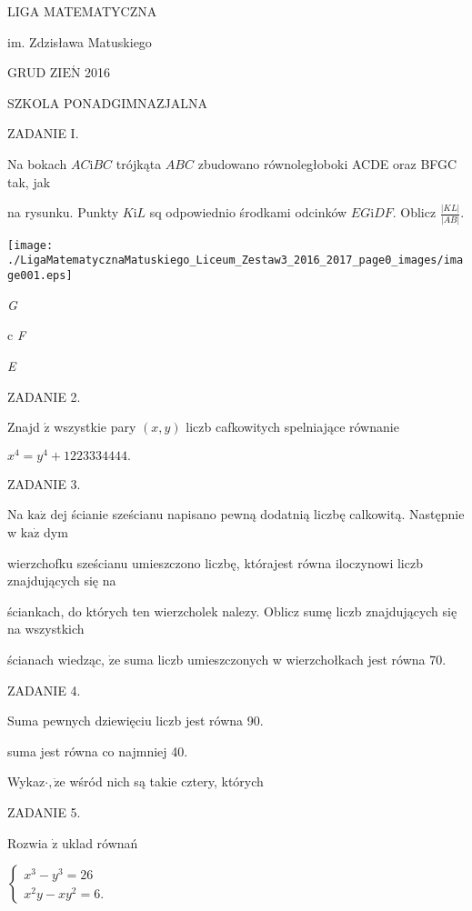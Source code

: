 \documentclass[a4paper,12pt]{article}
\begin{document}
LIGA MATEMATYCZNA

im. Zdzisława Matuskiego

GRUD Z$\mathrm{I}\mathrm{E}\acute{\mathrm{N}}$ 2016

SZKOLA PONADGIMNAZJALNA

ZADANIE I.

Na bokach $AC\mathrm{i}BC$ trójkąta $ABC$ zbudowano równoległoboki ACDE oraz BFGC tak, jak

na rysunku. Punkty $K\mathrm{i}L$ sq odpowiednio środkami odcinków $EG\mathrm{i}DF$. Oblicz $\displaystyle \frac{|KL|}{|AB|}.$
\begin{center}
\texttt{[image: ./LigaMatematycznaMatuskiego\_Liceum\_Zestaw3\_2016\_2017\_page0\_images/image001.eps]}
\end{center}
{\it G}

c  {\it F}

{\it E}

ZADANIE 2.

Znajd $\acute{\mathrm{z}}$ wszystkie pary $(x,y)$ liczb cafkowitych spelniające równanie

$x^{4}=y^{4}+1223334444.$

ZADANIE 3.

Na $\mathrm{k}\mathrm{a}\dot{\mathrm{z}}$ dej ścianie sześcianu napisano pewną dodatnią liczbę calkowitą. Następnie w $\mathrm{k}\mathrm{a}\dot{\mathrm{z}}$ dym

wierzchofku sześcianu umieszczono liczbę, którajest równa iloczynowi liczb znajdujących się na

ściankach, do których ten wierzcholek nalezy. Oblicz sumę liczb znajdujących się na wszystkich

ścianach wiedząc, $\dot{\mathrm{z}}\mathrm{e}$ suma liczb umieszczonych w wierzchołkach jest równa 70.

ZADANIE 4.

Suma pewnych dziewięciu liczb jest równa 90.

suma jest równa co najmniej 40.

Wykaz$\cdot, \dot{\mathrm{z}}\mathrm{e}$ wśród nich są takie cztery, których

ZADANIE 5.

Rozwia $\dot{\mathrm{z}}$ uklad równań

$\left\{\begin{array}{l}
x^{3}-y^{3}=26\\
x^{2}y-xy^{2}=6.
\end{array}\right.$
\end{document}
